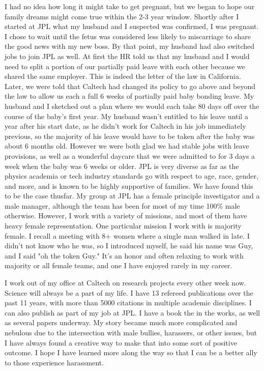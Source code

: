 \documentclass[utf8]{frontiersSCNS} %
\begin{document}
I had no idea how long it might take to get pregnant, but we began to hope our family dreams might come true within the 2-3 year window. Shortly after I started at JPL what my husband and I suspected was confirmed, I was pregnant. I chose to wait until the fetus was considered less likely to miscarriage to share the good news with my new boss. By that point, my husband had also switched jobs to join JPL as well. At first the HR told us that my husband and I would need to split a portion of our partially paid leave with each other because we shared the same employer. This is indeed the letter of the law in California. Later, we were told that Caltech had changed its policy to go above and beyond the law to allow us each a full 6 weeks of partially paid baby bonding leave. My husband and I sketched out a plan where we would each take 80 days off over the course of the baby's first year. My husband wasn't entitled to his leave until a year after his start date, as he didn't work for Caltech in his job immediately previous, so the majority of his leave would have to be taken after the baby was about 6 months old. However we were both glad we had stable jobs with leave provisions, as well as a wonderful daycare that we were admitted to for 3 days a week when the baby was 6 weeks or older. JPL is very diverse as far as the physics academia or tech industry standards go with respect to age, race, gender, and more, and is known to be highly supportive of families. We have found this to be the case thusfar. My group at JPL has a female principle investigator and a male manager, although the team has been for most of my time 100\% male otherwise. However, I work with a variety of missions, and most of them have heavy female representation. One particular mission I work with is majority female. I recall a meeting with 8+ women where a single man walked in late. I didn't not know who he was, so I introduced myself, he said his name was Guy, and I said "oh the token Guy." It's an honor and often relaxing to work with majority or all female teams, and one I have enjoyed rarely in my career.

I work out of my office at Caltech on research projects every other week now. Science will always be a part of my life. I have 13 refereed publications over the past 11 years, with more than 5000 citations in multiple academic disciplines. I can also publish as part of my job at JPL. I have a book the in the works, as well as several papers underway. My story became much more complicated and nebulous due to the intersection with male bullies, harassers, or other issues, but I have always found a creative way to make that into some sort of positive outcome. I hope I have learned more along the way so that I can be a better ally to those experience harassment. 
\end{document}
